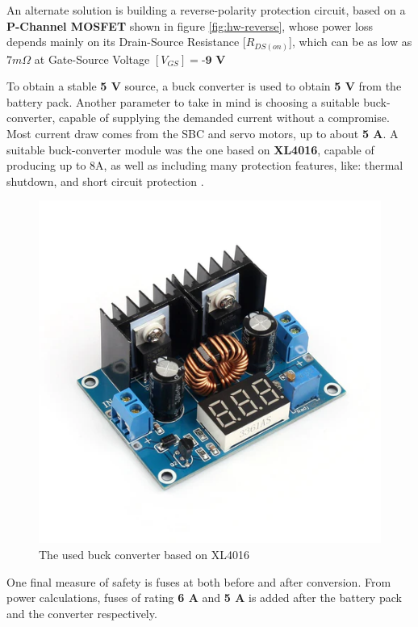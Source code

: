 An alternate solution is building a reverse-polarity protection circuit, based on a \textbf{P-Channel MOSFET} shown in figure \ref{fig:hw-reverse}, whose power loss depends mainly on its Drain-Source Resistance [$R_{DS(on)}$], which can be as low as $7 m\Omega$ at Gate-Source Voltage $[V_{GS}] = \textbf{-9 V}$ \cite{AOD403-datasheet}


To obtain a stable \textbf{5 V} source, a buck converter is used to obtain \textbf{5 V} from the battery pack. Another parameter to take in mind is choosing a suitable buck-converter, capable of supplying the demanded current without a compromise. Most current draw comes from the SBC and servo motors, up to about \textbf{5 A}. A suitable buck-converter module was the one based on \textbf{XL4016}, capable of producing up to 8A, as well as including many protection features, like: thermal shutdown, and short circuit protection \cite{XL4016-datasheet}.

\newpage

\begin{figure}[h!]
	\centering
	\includegraphics[scale=0.5]{./Figures/HW/xl4016.png}
	\caption{The used buck converter based on XL4016}
	\label{fig:hw-buck}
\end{figure}

One final measure of safety is fuses at both before and after conversion. From power calculations, fuses of rating \textbf{6 A} and \textbf{5 A} is added after the battery pack and the converter respectively.

